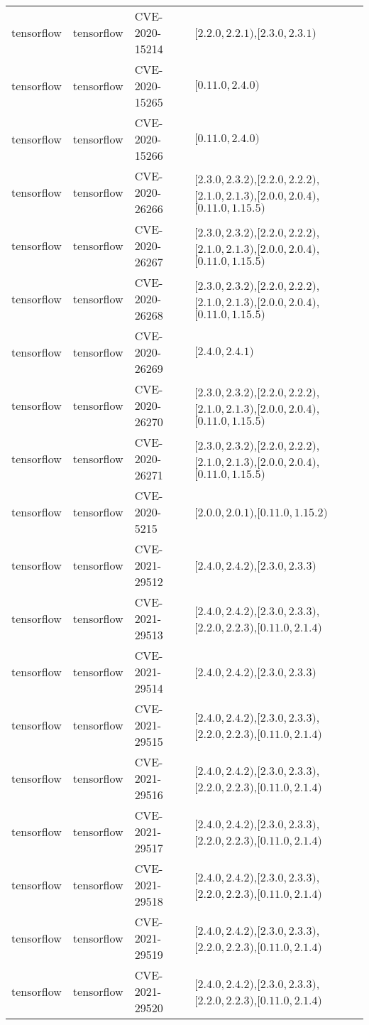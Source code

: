 \begin{tabular}{llll}
tensorflow & tensorflow & CVE-2020-15214 & $[2.2.0,2.2.1)$,$[2.3.0,2.3.1)$ \\
tensorflow & tensorflow & CVE-2020-15265 & $[0.11.0,2.4.0)$ \\
tensorflow & tensorflow & CVE-2020-15266 & $[0.11.0,2.4.0)$ \\
tensorflow & tensorflow & CVE-2020-26266 & $[2.3.0,2.3.2)$,$[2.2.0,2.2.2)$,$[2.1.0,2.1.3)$,$[2.0.0,2.0.4)$,$[0.11.0,1.15.5)$ \\
tensorflow & tensorflow & CVE-2020-26267 & $[2.3.0,2.3.2)$,$[2.2.0,2.2.2)$,$[2.1.0,2.1.3)$,$[2.0.0,2.0.4)$,$[0.11.0,1.15.5)$ \\
tensorflow & tensorflow & CVE-2020-26268 & $[2.3.0,2.3.2)$,$[2.2.0,2.2.2)$,$[2.1.0,2.1.3)$,$[2.0.0,2.0.4)$,$[0.11.0,1.15.5)$ \\
tensorflow & tensorflow & CVE-2020-26269 & $[2.4.0,2.4.1)$ \\
tensorflow & tensorflow & CVE-2020-26270 & $[2.3.0,2.3.2)$,$[2.2.0,2.2.2)$,$[2.1.0,2.1.3)$,$[2.0.0,2.0.4)$,$[0.11.0,1.15.5)$ \\
tensorflow & tensorflow & CVE-2020-26271 & $[2.3.0,2.3.2)$,$[2.2.0,2.2.2)$,$[2.1.0,2.1.3)$,$[2.0.0,2.0.4)$,$[0.11.0,1.15.5)$ \\
tensorflow & tensorflow & CVE-2020-5215 & $[2.0.0,2.0.1)$,$[0.11.0,1.15.2)$ \\
tensorflow & tensorflow & CVE-2021-29512 & $[2.4.0,2.4.2)$,$[2.3.0,2.3.3)$ \\
tensorflow & tensorflow & CVE-2021-29513 & $[2.4.0,2.4.2)$,$[2.3.0,2.3.3)$,$[2.2.0,2.2.3)$,$[0.11.0,2.1.4)$ \\
tensorflow & tensorflow & CVE-2021-29514 & $[2.4.0,2.4.2)$,$[2.3.0,2.3.3)$ \\
tensorflow & tensorflow & CVE-2021-29515 & $[2.4.0,2.4.2)$,$[2.3.0,2.3.3)$,$[2.2.0,2.2.3)$,$[0.11.0,2.1.4)$ \\
tensorflow & tensorflow & CVE-2021-29516 & $[2.4.0,2.4.2)$,$[2.3.0,2.3.3)$,$[2.2.0,2.2.3)$,$[0.11.0,2.1.4)$ \\
tensorflow & tensorflow & CVE-2021-29517 & $[2.4.0,2.4.2)$,$[2.3.0,2.3.3)$,$[2.2.0,2.2.3)$,$[0.11.0,2.1.4)$ \\
tensorflow & tensorflow & CVE-2021-29518 & $[2.4.0,2.4.2)$,$[2.3.0,2.3.3)$,$[2.2.0,2.2.3)$,$[0.11.0,2.1.4)$ \\
tensorflow & tensorflow & CVE-2021-29519 & $[2.4.0,2.4.2)$,$[2.3.0,2.3.3)$,$[2.2.0,2.2.3)$,$[0.11.0,2.1.4)$ \\
tensorflow & tensorflow & CVE-2021-29520 & $[2.4.0,2.4.2)$,$[2.3.0,2.3.3)$,$[2.2.0,2.2.3)$,$[0.11.0,2.1.4)$ \\

\end{tabular}
